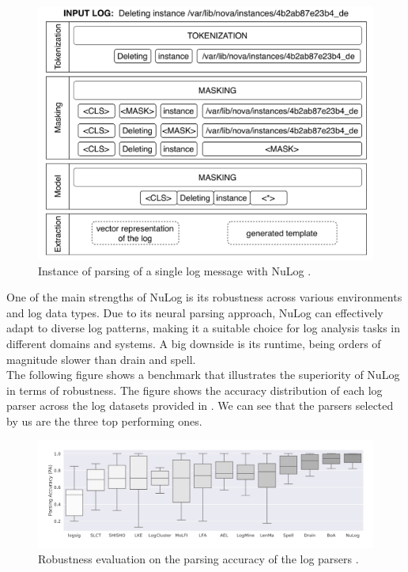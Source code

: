 \begin{figure}[H]
    \centering
    \includegraphics[keepaspectratio=true,scale=0.55]{figures/4_methods/6_nulog_workflow.png}
    \caption{Instance of parsing of a single log message with NuLog \cite{nedelkoski2020selfsupervised}.}
    \label{fig:nulogWorkflow}
\end{figure}

One of the main strengths of NuLog is its robustness across various environments and log data types. Due to its neural parsing approach, NuLog can effectively adapt to diverse log patterns, making it a suitable choice for log analysis tasks in different domains and systems. A big downside is its runtime, being orders of magnitude slower than drain and spell. \\

The following figure shows a benchmark that illustrates the superiority of NuLog in terms of robustness. The figure shows the accuracy distribution of each log parser across the log datasets provided in \cite{zhu2019tools}. We can see that the parsers selected by us are the three top performing ones. 

\begin{figure}[H]
    \centering
    \includegraphics[keepaspectratio=true,scale=0.7]{figures/4_methods/7_parser_accuracy_robustness.png}
    \caption{ Robustness evaluation on the parsing accuracy of the log parsers \cite{nedelkoski2020selfsupervised}.}
    \label{fig:parserAccuracy}
\end{figure}


